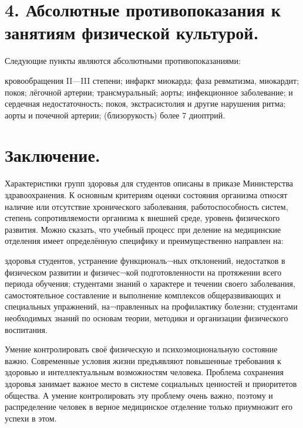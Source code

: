 \documentclass[bachelor, och, referat ]{SCWorks}
\begin{document}
\section{4. Абсолютные противопоказания к занятиям физической культурой.}
Следующие пункты являются абсолютными противопоказаниями:
\begin{itemize}
\begin{itemize}
 кровообращения II—III степени;
 инфаркт миокарда;
 фаза ревматизма, миокардит; 
 покоя; 
 лёгочной артерии; 
 трансмуральный; 
 аорты; 
 инфекционное заболевание; 
 и сердечная недостаточность; 
 покоя, экстрасистолия и другие нарушения ритма; 
 аорты и почечной артерии; 
 (близорукость) более 7 диоптрий.
\end{itemize}
\end{itemize}
\newpage

\section*{Заключение.}
Характеристики групп здоровья для студентов описаны в приказе Министерства здравоохранения. К основным критериям оценки состояния организма относят наличие или отсутствие хронического заболевания, работоспособность систем, степень сопротивляемости организма к внешней среде, уровень физического развития.
Можно сказать, что учебный процесс при деление на медицинские отделения имеет определённую специфику и преимущественно направлен на:
\begin{itemize}
\begin{itemize}
 здоровья студентов, устранение функциональ¬ных отклонений, недостатков в физическом развитии и физичес¬кой подготовленности на протяжении всего периода обучения;
 студентами знаний о характере и течении своего заболевания, самостоятельное составление и выполнение комплексов общеразвивающих и специальных упражнений, на¬правленных на профилактику болезни;
 студентами необходимых знаний по основам теории, методики и организации физического воспитания.
\end{itemize}
\end{itemize}
Умение контролировать своё физическую и психоэмоциональную состояние важно. 
Современные условия жизни предъявляют повышенные требования к здоровью и интеллектуальным возможностям человека. Проблема сохранения здоровья занимает важное место в системе социальных ценностей и приоритетов общества. А умение контролировать эту проблему очень важно, поэтому и  распределение человек в верное медицинское отделение только приумножит его успехи в этом.
\newpage
\end{document}
